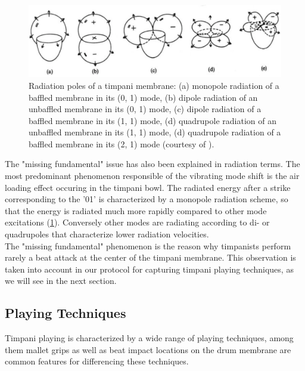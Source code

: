 \begin{figure}[H]
	\begin{center}
		\includegraphics[width=0.8\columnwidth]{Chapters/4/Pics/Pdf/timpaniRadiationPoles.pdf}
	\end{center}
	\vspace{-0.5cm}
	\caption[Radiation poles of a timpani membrane]{Radiation poles of a timpani membrane: (a) monopole radiation of a baffled membrane in its (0, 1) mode, (b) dipole radiation of an unbaffled membrane in its (0, 1) mode, (c) dipole radiation of a baffled membrane in its (1, 1) mode, (d) quadrupole radiation of an unbaffled membrane in its (1, 1) mode, (d) quadrupole radiation of a baffled membrane in its (2, 1) mode (courtesy of ).}
	\label{fig:timpaniRadiationPoles}
\end{figure}

The "missing fundamental" issue has also been explained in radiation terms. The most predominant phenomenon responsible of the vibrating mode shift is the air loading effect  occuring in the timpani bowl. The radiated energy after a strike corresponding to the '01' is characterized by a monopole radiation scheme, so that the energy is radiated much more rapidly compared to other mode excitations (\myfigname \ref{fig:timpaniRadiationPoles}). Conversely other modes are radiating according to di- or quadrupoles that characterize lower radiation velocities.\\

The "missing fundamental" phenomenon is the reason why timpanists perform rarely a beat attack at the center of the timpani membrane. This observation is taken into account in our protocol for capturing timpani playing techniques, as we will see in the next section.



		\subsection{Playing Techniques}
		\label{subsec:Analysis_TimpaniBasics_Playing}

Timpani playing is characterized by a wide range of playing techniques, among them mallet grips as well as beat impact locations on the drum membrane are common features for differencing these techniques.\\

